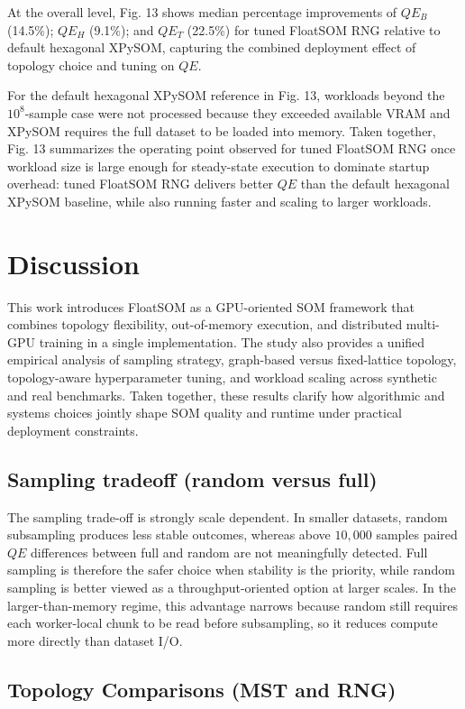 \documentclass[10pt]{article} %
\begin{document}
At the overall level, Fig. 13 shows median percentage improvements of $QE_B$ (14.5\%); $QE_H$ (9.1\%); and $QE_T$ (22.5\%) for tuned FloatSOM RNG relative to default hexagonal XPySOM, capturing the combined deployment effect of topology choice and tuning on $QE$.

For the default hexagonal XPySOM reference in Fig. 13, workloads beyond the $10^8$-sample case were not processed because they exceeded available VRAM and XPySOM requires the full dataset to be loaded into memory. Taken together, Fig. 13 summarizes the operating point observed for tuned FloatSOM RNG once workload size is large enough for steady-state execution to dominate startup overhead: tuned FloatSOM RNG delivers better $QE$ than the default hexagonal XPySOM baseline, while also running faster and scaling to larger workloads.

\section{Discussion}

This work introduces FloatSOM as a GPU-oriented SOM framework that combines topology flexibility, out-of-memory execution, and distributed multi-GPU training in a single implementation. The study also provides a unified empirical analysis of sampling strategy, graph-based versus fixed-lattice topology, topology-aware hyperparameter tuning, and workload scaling across synthetic and real benchmarks. Taken together, these results clarify how algorithmic and systems choices jointly shape SOM quality and runtime under practical deployment constraints.

\subsection{Sampling tradeoff (random versus full)}

The sampling trade-off is strongly scale dependent. In smaller datasets, random subsampling produces less stable outcomes, whereas above $10{,}000$ samples paired $QE$ differences between full and random are not meaningfully detected. Full sampling is therefore the safer choice when stability is the priority, while random sampling is better viewed as a throughput-oriented option at larger scales. In the larger-than-memory regime, this advantage narrows because random still requires each worker-local chunk to be read before subsampling, so it reduces compute more directly than dataset I/O.

\subsection{Topology Comparisons (MST and RNG)}
\end{document}
